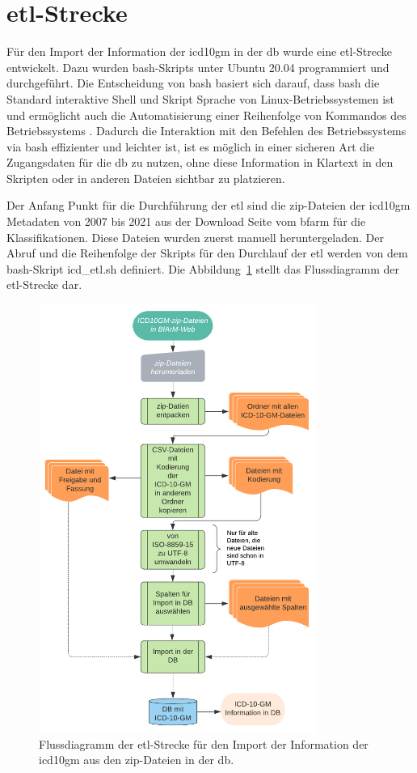 \section{\acs{etl}-Strecke} \label{sec:etlpipeline}

Für den Import der Information der \ac{icd10gm} in der \ac{db} wurde eine \ac{etl}-Strecke entwickelt. Dazu wurden \ac{bash}-Skripts unter Ubuntu 20.04 programmiert und durchgeführt. Die Entscheidung von \ac{bash} basiert sich darauf, dass \ac{bash} die Standard interaktive Shell und Skript Sprache von Linux-Betriebssystemen ist und ermöglicht auch die Automatisierung einer Reihenfolge von Kommandos des Betriebssystems \cite{bash}. Dadurch die Interaktion mit den Befehlen des Betriebssystems via \ac{bash} effizienter und leichter ist, ist es möglich in einer sicheren Art die Zugangsdaten für die \ac{db} zu nutzen, ohne diese Information in Klartext in den Skripten oder in anderen Dateien sichtbar zu platzieren.

Der Anfang Punkt für die Durchführung der \ac{etl} sind die \ac{zip}-Dateien der \ac{icd10gm} Metadaten von 2007 bis 2021 aus der Download Seite vom \ac{bfarm} für die Klassifikationen. Diese Dateien wurden zuerst manuell heruntergeladen. Der Abruf und die Reihenfolge der Skripts für den Durchlauf der \ac{etl} werden von dem \ac{bash}-Skript \textsf{icd\_etl.sh} definiert. Die Abbildung~\ref{fig:etl} stellt das Flussdiagramm der \ac{etl}-Strecke dar.

\clearpage
\begin{figure}[ht]
	\centering
	\includegraphics[height=14cm]{figures/etl}
	\caption[\acs{etl}-Strecke]{Flussdiagramm der \acs{etl}-Strecke für den Import der Information der \ac{icd10gm} aus den \ac{zip}-Dateien in der \ac{db}.}
	\label{fig:etl}
\end{figure} 

